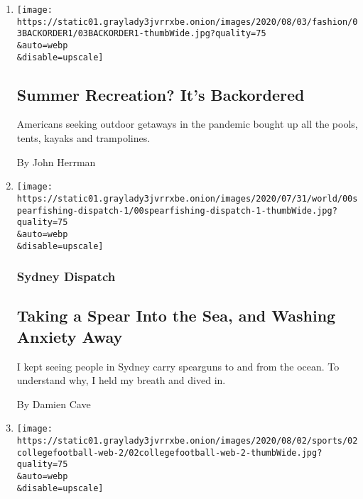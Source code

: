 \begin{enumerate}
\def\labelenumi{\arabic{enumi}.}
\item
  \href{/2020/08/04/style/outdoor-camping-gear-pools-backordered.html}{}

  \texttt{[image: https://static01.graylady3jvrrxbe.onion/images/2020/08/03/fashion/03BACKORDER1/03BACKORDER1-thumbWide.jpg?quality=75\\\&auto=webp\\\&disable=upscale]}

  \hypertarget{summer-recreation-its-backordered}{%
  \subsection{Summer Recreation? It's
  Backordered}\label{summer-recreation-its-backordered}}

  Americans seeking outdoor getaways in the pandemic bought up all the
  pools, tents, kayaks and trampolines.

  By John Herrman
\item
  \href{/2020/08/03/world/australia/spearfishing-sydney-coronavirus.html}{}

  \texttt{[image: https://static01.graylady3jvrrxbe.onion/images/2020/07/31/world/00spearfishing-dispatch-1/00spearfishing-dispatch-1-thumbWide.jpg?quality=75\\\&auto=webp\\\&disable=upscale]}

  \hypertarget{sydney-dispatch}{%
  \subsubsection{Sydney Dispatch}\label{sydney-dispatch}}

  \hypertarget{taking-a-spear-into-the-sea-and-washing-anxiety-away}{%
  \subsection{Taking a Spear Into the Sea, and Washing Anxiety
  Away}\label{taking-a-spear-into-the-sea-and-washing-anxiety-away}}

  I kept seeing people in Sydney carry spearguns to and from the ocean.
  To understand why, I held my breath and dived in.

  By Damien Cave
\item
  \href{/2020/08/02/sports/ncaafootball/coronavirus-college-football-pac-12.html}{}

  \texttt{[image: https://static01.graylady3jvrrxbe.onion/images/2020/08/02/sports/02collegefootball-web-2/02collegefootball-web-2-thumbWide.jpg?quality=75\\\&auto=webp\\\&disable=upscale]}


\end{enumerate}
